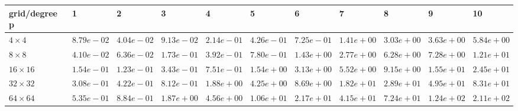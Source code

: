 \begin{tabular}{lllllllllll}
\hline
 grid/degree p   & 1          & 2          & 3          & 4          & 5          & 6          & 7          & 8          & 9          & 10         \\
\hline
 $4 \times 4$    & $8.79e-02$ & $4.04e-02$ & $9.13e-02$ & $2.14e-01$ & $4.26e-01$ & $7.25e-01$ & $1.41e+00$ & $3.03e+00$ & $3.63e+00$ & $5.84e+00$ \\
 $8 \times 8$    & $4.10e-02$ & $6.36e-02$ & $1.73e-01$ & $3.92e-01$ & $7.80e-01$ & $1.43e+00$ & $2.77e+00$ & $6.28e+00$ & $7.28e+00$ & $1.21e+01$ \\
 $16 \times 16$  & $1.54e-01$ & $1.23e-01$ & $3.43e-01$ & $7.51e-01$ & $1.54e+00$ & $3.13e+00$ & $5.52e+00$ & $9.15e+00$ & $1.55e+01$ & $2.45e+01$ \\
 $32 \times 32$  & $3.08e-01$ & $4.22e-01$ & $8.12e-01$ & $1.88e+00$ & $4.25e+00$ & $8.69e+00$ & $1.82e+01$ & $2.89e+01$ & $4.95e+01$ & $8.31e+01$ \\
 $64 \times 64$  & $5.35e-01$ & $8.84e-01$ & $1.87e+00$ & $4.56e+00$ & $1.06e+01$ & $2.17e+01$ & $4.15e+01$ & $7.24e+01$ & $1.24e+02$ & $2.11e+02$ \\
\hline
\end{tabular}